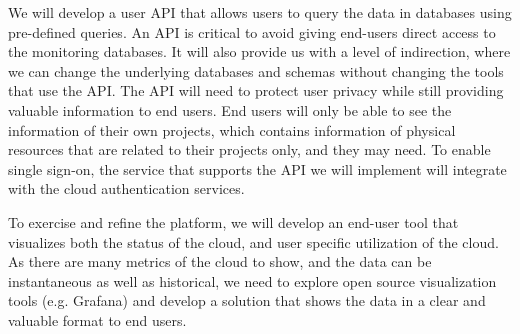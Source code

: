 We will develop a user API that allows users to query the data in databases using pre-defined queries. An API is critical to avoid giving end-users direct access to the monitoring databases.  It will also provide us with a level of indirection, where we can change the underlying databases and schemas without changing the tools that use the API.  The API will need to protect user privacy while still providing valuable information to end users.  End users will only be able to see the information of their own projects, which contains information of physical resources that are related to their projects only, and they may need. To enable single sign-on, the service that supports the API we will implement will integrate with the cloud authentication services.

To exercise and refine the platform, we will develop an end-user tool that visualizes both the status of the cloud, and user specific utilization of the cloud. As there are many metrics of the cloud to show, and the data can be instantaneous as well as historical, we need to explore open source visualization tools (e.g. Grafana) and develop a solution that shows the data in a clear and valuable format to end users. 





